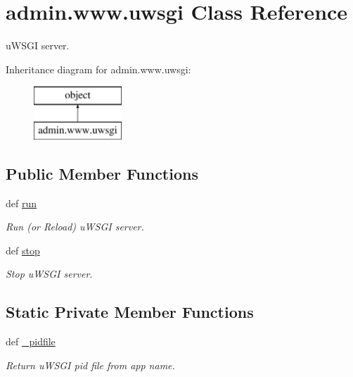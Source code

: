 \hypertarget{classadmin_1_1www_1_1uwsgi}{\section{admin.\-www.\-uwsgi Class Reference}
\label{classadmin_1_1www_1_1uwsgi}
}


u\-W\-S\-G\-I server.  


Inheritance diagram for admin.\-www.\-uwsgi\-:\begin{figure}[H]
\begin{center}
\leavevmode
\includegraphics[height=2.000000cm]{db/de4/classadmin_1_1www_1_1uwsgi}
\end{center}
\end{figure}
\subsection*{Public Member Functions}
\begin{DoxyCompactItemize}
\item 
def \hyperlink{classadmin_1_1www_1_1uwsgi_ab5860b95c90e736ad96fb7273efa10a5}{run}
\begin{DoxyCompactList}\small\item\em Run (or Reload) u\-W\-S\-G\-I server. \end{DoxyCompactList}\item 
def \hyperlink{classadmin_1_1www_1_1uwsgi_a01b2b5c841e2da98a5e88286de95bd05}{stop}
\begin{DoxyCompactList}\small\item\em Stop u\-W\-S\-G\-I server. \end{DoxyCompactList}\end{DoxyCompactItemize}
\subsection*{Static Private Member Functions}
\begin{DoxyCompactItemize}
\item 
def \hyperlink{classadmin_1_1www_1_1uwsgi_aefa1ab9824e26e8da07141806cd69ed7}{\-\_\-pidfile}
\begin{DoxyCompactList}\small\item\em Return u\-W\-S\-G\-I pid file from app name. \end{DoxyCompactList}\end{DoxyCompactItemize}


